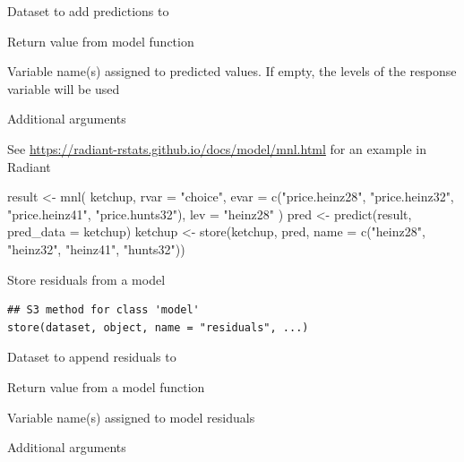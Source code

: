 \documentclass[a4paper]{book}
\begin{document}
%
\begin{Arguments}
\begin{ldescription}
\item[\code{dataset}] Dataset to add predictions to

\item[\code{object}] Return value from model function

\item[\code{name}] Variable name(s) assigned to predicted values. If empty, the levels of the response variable will be used

\item[\code{...}] Additional arguments
\end{ldescription}
\end{Arguments}
%
\begin{Details}
See \url{https://radiant-rstats.github.io/docs/model/mnl.html} for an example in Radiant
\end{Details}
%
\begin{Examples}
\begin{ExampleCode}
result <- mnl(
  ketchup,
  rvar = "choice",
  evar = c("price.heinz28", "price.heinz32", "price.heinz41", "price.hunts32"),
  lev = "heinz28"
)
pred <- predict(result, pred_data = ketchup)
ketchup <- store(ketchup, pred, name = c("heinz28", "heinz32", "heinz41", "hunts32"))

\end{ExampleCode}
\end{Examples}
%
\begin{Description}
Store residuals from a model
\end{Description}
%
\begin{Usage}
\begin{verbatim}
## S3 method for class 'model'
store(dataset, object, name = "residuals", ...)
\end{verbatim}
\end{Usage}
%
\begin{Arguments}
\begin{ldescription}
\item[\code{dataset}] Dataset to append residuals to

\item[\code{object}] Return value from a model function

\item[\code{name}] Variable name(s) assigned to model residuals

\item[\code{...}] Additional arguments
\end{ldescription}
\end{Arguments}
\end{document}
